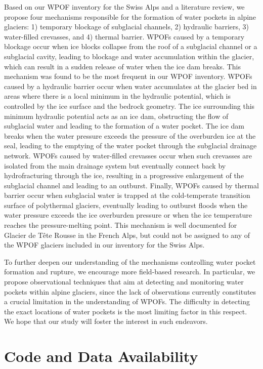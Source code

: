 Based on our WPOF inventory for the Swiss Alps and a literature review, we propose four mechanisms responsible for the formation of water pockets in alpine glaciers: 1) temporary blockage of subglacial channels, 2) hydraulic barriers, 3) water-filled crevasses, and 4) thermal barrier. WPOFs caused by a temporary blockage occur when ice blocks collapse from the roof of a subglacial channel or a subglacial cavity, leading to blockage and water accumulation within the glacier, which can result in a sudden release of water when the ice dam breaks. This mechanism was found to be the most frequent in our WPOF inventory. WPOFs caused by a hydraulic barrier occur when water accumulates at the glacier bed in areas where there is a local minimum in the hydraulic potential, which is controlled by the ice surface and the bedrock geometry. The ice surrounding this minimum hydraulic potential acts as an ice dam, obstructing the flow of subglacial water and leading to the formation of a water pocket. The ice dam breaks when the water pressure exceeds the pressure of the overburden ice at the seal, leading to the emptying of the water pocket through the subglacial drainage network. WPOFs caused by water-filled crevasses occur when such crevasses are isolated from the main drainage system but eventually connect back by hydrofracturing through the ice, resulting in a progressive enlargement of the subglacial channel and leading to an outburst. Finally, WPOFs caused by thermal barrier occur when subglacial water is trapped at the cold-temperate transition surface of polythermal glaciers, eventually leading to outburst floods when the water pressure exceeds the ice overburden pressure or when the ice temperature reaches the pressure-melting point. This mechanism is well documented for Glacier de Tête Rousse in the French Alps, but could not be assigned to any of the WPOF glaciers included in our inventory for the Swiss Alps.

To further deepen our understanding of the mechanisms controlling water pocket formation and rupture, we encourage more field-based research. In particular, we propose observational techniques that aim at detecting and monitoring water pockets within alpine glaciers, since the lack of observations currently constitutes a crucial limitation in the understanding of WPOFs. The difficulty in detecting the exact locations of water pockets is the most limiting factor in this respect. We hope that our study will foster the interest in such endeavors.

\section{ Code and Data Availability}

